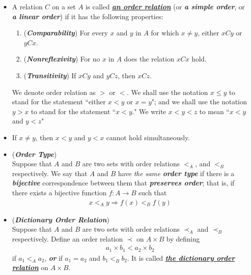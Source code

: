 \documentclass[11pt]{article}
\begin{document}
\begin{itemize}
\item  \begin{definition}
A relation $C$ on a set $A$ is called \underline{\emph{\textbf{an order relation}}} (or \emph{\textbf{a simple order}}, or \emph{\textbf{a linear order}})
if it has the following properties:
\begin{enumerate}
\item (\emph{\textbf{Comparability}}) For every $x$ and $y$ in $A$ for which $x \neq y$, either $xCy$ or $yCx$.
\item (\emph{\textbf{Nonreflexivity}}) For no $x$ in $A$ does the relation $xCx$ hold.
\item (\emph{\textbf{Transitivity}}) If $xCy$ and $yCz$, then $xCz$.
\end{enumerate}
We denote order relation as $>$ or $<$. We shall use the notation $x \le y$ to stand for the statement ``either $x < y$ or $x = y$";
and we shall use the notation $y > x$ to stand for the statement ``$x < y$." We write $x < y < z$ to mean ``$x < y$ and $y < z$"
\end{definition}

\item \begin{remark}
If $x \neq y$, then $x < y$ and $y < x$ cannot hold simultaneously.
\end{remark}

\item \begin{definition} (\textbf{\emph{Order Type}})\\
Suppose that $A$ and $B$ are two sets with order relations $<_A$, and $<_B$ respectively. We say that $A$ and $B$ have \emph{the same \textbf{order type}} if there is a \emph{\textbf{bijective}} correspondence between them that \emph{\textbf{preserves order}}; that is, if there exists a bijective
function $f : A \rightarrow B$ such that
\begin{align*}
x <_{A} y \Rightarrow f(x) <_B f(y)
\end{align*}
\end{definition}

\item \begin{definition}(\emph{\textbf{Dictionary Order Relation}})\\
Suppose that $A$ and $B$ are two sets with order relations  $\prec_A$ and $\prec_B$ respectively. Define an order relation $\prec$ on $A \times B$ by defining
\begin{align*}
a_1 \times b_1 < a_2 \times b_2
\end{align*}
if $a_1 <_A a_2$, \emph{\textbf{or}} if $a_1 = a_2$ and $b_1 <_B b_2$. It is called \underline{\emph{\textbf{the dictionary order relation}}} on $A \times B$.
\end{definition}


\end{itemize}
\end{document}
